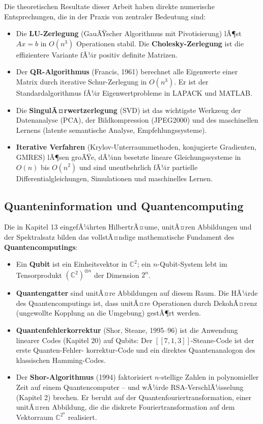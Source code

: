 ﻿\documentclass[a4paper,12pt]{report}
\theoremstyle{definition}
\begin{document}
Die theoretischen Resultate dieser Arbeit haben direkte numerische
Entsprechungen, die in der Praxis von zentraler Bedeutung sind:
\begin{itemize}
    \item[-] Die \textbf{LU-Zerlegung} (GauÃŸscher Algorithmus mit
          Pivotisierung) lÃ¶st $Ax = b$ in $O(n^3)$ Operationen
          stabil. Die \textbf{Cholesky-Zerlegung} ist die
          effizientere Variante fÃ¼r positiv definite Matrizen.
    \item[-] Der \textbf{QR-Algorithmus} (Francis, 1961) berechnet
          alle Eigenwerte einer Matrix durch iterative Schur-Zerlegung
          in $O(n^3)$. Er ist der Standardalgorithmus fÃ¼r
          Eigenwertprobleme in LAPACK und MATLAB.
    \item[-] Die \textbf{SingulÃ¤rwertzerlegung} (SVD) ist das
          wichtigste Werkzeug der Datenanalyse (PCA), der
          Bildkompression (JPEG2000) und des maschinellen Lernens
          (latente semantische Analyse, Empfehlungssysteme).
    \item[-] \textbf{Iterative Verfahren} (Krylov-Unterraummethoden,
          konjugierte Gradienten, GMRES) lÃ¶sen groÃŸe, dÃ¼nn besetzte
          lineare Gleichungssysteme in $O(n)$ bis $O(n^2)$ und sind
          unentbehrlich fÃ¼r partielle Differentialgleichungen,
          Simulationen und maschinelles Lernen.
\end{itemize}

\subsection*{Quanteninformation und Quantencomputing}

Die in Kapitel 13 eingefÃ¼hrten HilbertrÃ¤ume, unitÃ¤ren Abbildungen
und der Spektralsatz bilden das vollstÃ¤ndige mathematische Fundament
des \textbf{Quantencomputings}:
\begin{itemize}
    \item[-] Ein \textbf{Qubit} ist ein Einheitsvektor in $\mathbb{C}^2$;
          ein $n$-Qubit-System lebt im Tensorprodukt
          $(\mathbb{C}^2)^{\otimes n}$ der Dimension $2^n$.
    \item[-] \textbf{Quantengatter} sind unitÃ¤re Abbildungen auf
          diesem Raum. Die HÃ¼rde des Quantencomputings ist, dass
          unitÃ¤re Operationen durch DekohÃ¤renz (ungewollte Kopplung
          an die Umgebung) gestÃ¶rt werden.
    \item[-] \textbf{Quantenfehlerkorrektur} (Shor, Steane, 1995--96)
          ist die Anwendung linearer Codes (Kapitel 20) auf Qubits:
          Der $[[7,1,3]]$-Steane-Code ist der erste Quanten-Fehler-
          korrektur-Code und ein direktes Quantenanalogon des
          klassischen Hamming-Codes.
    \item[-] Der \textbf{Shor-Algorithmus} (1994) faktorisiert
          $n$-stellige Zahlen in polynomieller Zeit auf einem
          Quantencomputer -- und wÃ¼rde RSA-VerschlÃ¼sselung
          (Kapitel 2) brechen. Er beruht auf der
          Quantenfouriertransformation, einer unitÃ¤ren Abbildung,
          die die diskrete Fouriertransformation auf dem
          Vektorraum $\mathbb{C}^{2^n}$ realisiert.
\end{itemize}
\end{document}
